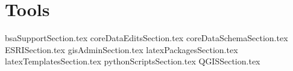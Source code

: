 
\chapter{Tools}
{bsaSupportSection.tex}
\clearpage
{coreDataEditsSection.tex}
\clearpage
{coreDataSchemaSection.tex}
\clearpage
{ESRISection.tex}
\clearpage
{gisAdminSection.tex}
\clearpage
{latexPackagesSection.tex}
\clearpage
{latexTemplatesSection.tex}
\clearpage
{pythonScriptsSection.tex}
\clearpage
{QGISSection.tex}
\clearpage

